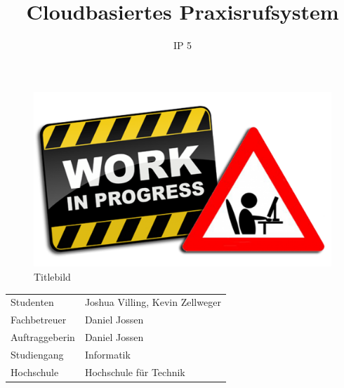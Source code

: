 \documentclass[final]{fhnwreport}
\title{Cloudbasiertes Praxisrufsystem}  %
\author{IP 5}                      %
\begin{document}
    \maketitle
    \begin{figure}[h]\label{fig:title}
        \includegraphics[width=\linewidth]{graphics/wip}\caption[Titlebild]{Titlebild}
    \end{figure}

    \begin{center}
        \renewcommand\arraystretch{2}
        \begin{tabular}{l l}
            Studenten & Joshua Villing, Kevin Zellweger\\
            Fachbetreuer & Daniel Jossen\\
            Auftraggeberin & Daniel Jossen\\
            Studiengang & Informatik\\
            Hochschule & Hochschule für Technik
        \end{tabular}
    \end{center}

    \clearpage


    \thispagestyle{empty}
    

    \setcounter{tocdepth}{2}
    \tableofcontents
    \clearpage

    
    
    
    
    
    
    


    
\end{document}
